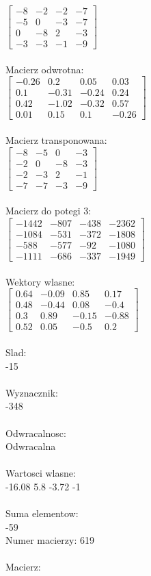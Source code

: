\documentclass[a4paper,12pt]{article}
\begin{document}
$\begin{bmatrix} -8&-2&-2&-7\\-5&0&-3&-7\\0&-8&2&-3\\-3&-3&-1&-9 \end{bmatrix}$
\\
\\
Macierz odwrotna:\\

$\begin{bmatrix} -0.26&0.2&0.05&0.03\\0.1&-0.31&-0.24&0.24\\0.42&-1.02&-0.32&0.57\\0.01&0.15&0.1&-0.26 \end{bmatrix}$
\\
\\
Macierz transponowana:\\

$\begin{bmatrix} -8&-5&0&-3\\-2&0&-8&-3\\-2&-3&2&-1\\-7&-7&-3&-9 \end{bmatrix}$
\\
\\
Macierz do potegi 3:\\

$\begin{bmatrix} -1442&-807&-438&-2362\\-1084&-531&-372&-1808\\-588&-577&-92&-1080\\-1111&-686&-337&-1949 \end{bmatrix}$
\\
\\
Wektory wlasne:\\

$\begin{bmatrix} 0.64&-0.09&0.85&0.17\\0.48&-0.44&0.08&-0.4\\0.3&0.89&-0.15&-0.88\\0.52&0.05&-0.5&0.2 \end{bmatrix}$
\\
\\
Slad:\\
-15
\\
\\
Wyznacznik:\\
-348
\\
\\
Odwracalnosc:\\
Odwracalna
\\
\\
Wartosci wlasne:\\
-16.08 5.8 -3.72 -1
\\
\\
Suma elementow:\\
-59
\\
\newpage
Numer macierzy:
619
\\
\\
Macierz:\\
\end{document}
